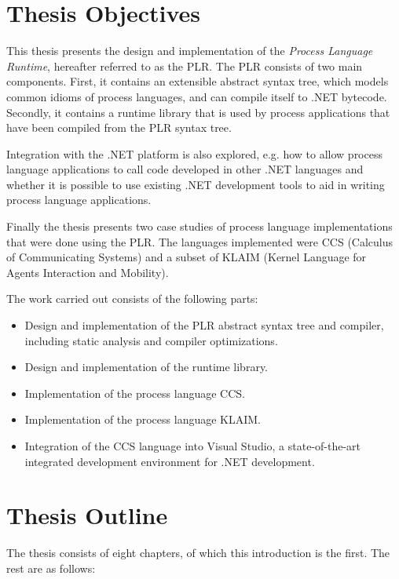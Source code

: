 \section{Thesis Objectives}

	This thesis presents the design and implementation of the \textit{Process 
	Language Runtime}, hereafter referred to as the PLR. The PLR consists of two 
	main components. First, it contains an extensible abstract syntax tree, 
	which models common idioms of process languages, and can compile itself to 
	.NET bytecode. Secondly, it contains a runtime library that is used by 
	process applications that have been compiled from the PLR syntax tree. 

	Integration with the .NET platform is also explored, e.g. how to allow 
	process language applications to call code developed in other .NET languages 
	and whether it is possible to use existing .NET development tools to aid in 
	writing process language applications.

	Finally the thesis presents two case studies of process language 
	implementations that were done using the PLR. The languages implemented were 
	CCS (Calculus of Communicating Systems) and a subset of KLAIM (Kernel 
	Language for Agents Interaction and Mobility).

	The work carried out consists of the following parts:

	\begin{itemize}
  	\item Design and implementation of the PLR abstract syntax tree and 
  				compiler, including static analysis and compiler optimizations.
  	\item Design and implementation of the runtime library.
  	\item Implementation of the process language CCS.
  	\item Implementation of the process language KLAIM.
  	\item Integration of the CCS language into Visual Studio, a 
  				state-of-the-art integrated development environment for .NET 
  				development.
	\end{itemize}


\section{Thesis Outline}

	The thesis consists of eight chapters, of which this introduction is the 
	first. The rest are as follows:


